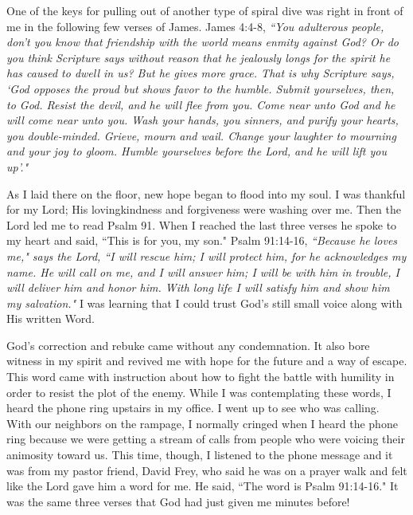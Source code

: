 \documentclass[oneside,12pt]{book}
\begin{document}
One of the keys for pulling out of another type of spiral dive was right in front of me in the following few verses of James. James 4:4-8, \textit{``You adulterous people, don't you know that friendship with the world means enmity against God? Or do you think Scripture says without reason that he jealously longs for the spirit he has caused to dwell in us? But he gives more grace. That is why Scripture says, `God opposes the proud but shows favor to the humble. Submit yourselves, then, to God. Resist the devil, and he will flee from you. Come near unto God and he will come near unto you. Wash your hands, you sinners, and purify your hearts, you double-minded. Grieve, mourn and wail. Change your laughter to mourning and your joy to gloom. Humble yourselves before the Lord, and he will lift you up'."}

As I laid there on the floor, new hope began to flood into my soul. I was thankful for my Lord; His lovingkindness and forgiveness were washing over me. Then the Lord led me to read Psalm 91. When I reached the last three verses he spoke to my heart and said, ``This is for you, my son." Psalm 91:14-16, \textit{``Because he loves me," says the Lord, ``I will rescue him; I will protect him, for he acknowledges my name. He will call on me, and I will answer him; I will be with him in trouble, I will deliver him and honor him. With long life I will satisfy him and show him my salvation."} I was learning that I could trust God's still small voice along with His written Word.


God's correction and rebuke came without any condemnation. It also bore witness in my spirit and revived me with hope for the future and a way of escape. This word came with instruction about how to fight the battle with humility in order to resist the plot of the enemy. While I was contemplating these words, I heard the phone ring upstairs in my office. I went up to see who was calling. With our neighbors on the rampage, I normally cringed when I heard the phone ring because we were getting a stream of calls from people who were voicing their animosity toward us. This time, though, I listened to the phone message and it was from my pastor friend, David Frey, who said he was on a prayer walk and felt like the Lord gave him a word for me. He said, ``The word is Psalm 91:14-16." It was the same three verses that God had just given me minutes before!
\end{document}
